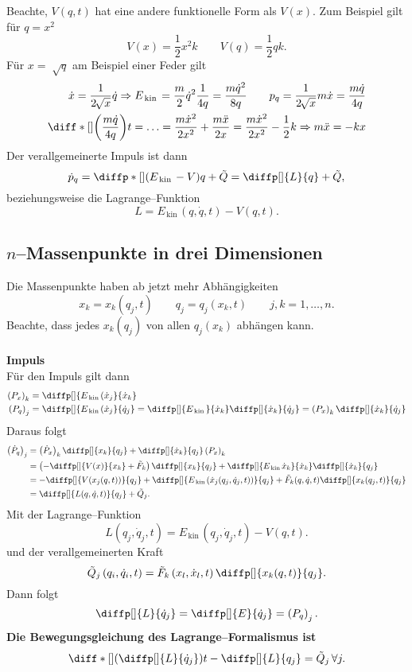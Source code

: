 \documentclass[a4paper,12pt]{article}
\numberwithin{equation}{section}
\begin{document}
Beachte, $V(q,t)$ hat eine andere funktionelle Form als $V(x)$. Zum Beispiel gilt für $q=x^2$
\[ 
        V(x)=\dfrac{1}{2}x^2k\qquad V(q)=\dfrac{1}{2}qk
.\] 
Für $x=\sqrt[]{q}$ am Beispiel einer Feder gilt
\begin{align*}
        \dot{x}=\dfrac{1}{2\,\sqrt[]{x}}\dot{q}\Rightarrow E_{\,\text{kin}\,}=\dfrac{m}{2}\dot{q}^2\dfrac{1}{4q}=\dfrac{m\dot{q}^2}{8q}\qquad p_q=\dfrac{1}{2\,\sqrt[]{x}}m\dot{x}=\dfrac{m\dot{q}}{4q}\\
        \diff*[]{\left(\dfrac{m\dot{q}}{4q}\right)}{t}=\hdots =\dfrac{m\dot{x}^2}{2x^2}+\dfrac{m\ddot{x}}{2x}=\dfrac{m\dot{x}^2}{2x^2}-\dfrac{1}{2}k\Rightarrow m\ddot{x}=-kx
\end{align*}
Der verallgemeinerte Impuls ist dann
\[ 
        \dot{p}_q=\diffp*[]{\left(E_{\,\text{kin}\,}-V\right)}{q}+\tilde Q=\diffp[]{L}{q}+\tilde Q
,\] 
beziehungsweise die Lagrange--Funktion
\[ 
        L=E_{\,\text{kin}\,}(q,\dot{q},t)-V(q,t)
.\] 

\subsection{$n$--Massenpunkte in drei Dimensionen}
Die Massenpunkte haben ab jetzt mehr Abhängigkeiten
\[ 
        x_k=x_k(q_j,t)\qquad q_j=q_j(x_k,t)\qquad j,k=1,\hdots ,n
.\] 
Beachte, dass jedes $x_k(q_j)$ von allen $q_j(x_k)$ abhängen kann.
\\\hfill\\\textbf{Impuls}\\ 
Für den Impuls gilt dann
\begin{align*}
        \left(P_x\right)_k&=\diffp[]{E_{\,\text{kin}\,}(\dot{x}_j}{\dot{x}_k}\\
        \left(P_q\right)_j&=\diffp[]{E_{\,\text{kin}\,}(\dot{x}_j}{\dot{q}_j}=\diffp[]{E_{\,\text{kin}\,}}{\dot{x}_k}\diffp[]{\dot{x}_k}{\dot{q}_j}=\left(P_x\right)_k\diffp[]{\dot{x}_k}{\dot{q}_j}
\end{align*}
Daraus folgt
\begin{align*}
        \left(\dot{P}_q\right)_j&=\left(\dot{P}_x\right)_k\diffp[]{x_k}{q_j}+\diffp[]{\dot{x}_k}{q_j}\left(P_x\right)_k\\
                                &=\left(-\diffp[]{V(x)}{x_k}+\tilde F_k\right)\diffp[]{x_k}{q_j}+\diffp[]{E_{\,\text{kin}\,}\dot{x}_k}{\dot{x}_k}\diffp[]{\dot{x}_k}{q_j}\\
                                &=-\diffp[]{V(x_j(q,t))}{q_j}+\diffp[]{E_{\,\text{kin}\,}(\dot{x}_j(q_j,\dot{q}_j,t))}{q_j}+\tilde F_k(q,\dot{q},t)\diffp[]{x_k(q_j,t)}{q_j}\\
                                &=\diffp[]{L(q,\dot{q},t)}{q_j}+\tilde Q_j
.\end{align*}
Mit der Lagrange--Funktion 
\[ 
L(q_j,\dot{q}_j,t)=E_{\,\text{kin}\,}\left(q_j,\dot{q}_j,t\right)-V(q,t)
.\]
und der verallgemeinerten Kraft 
\[
        \tilde Q_j\left(q_i,\dot{q}_i,t\right)=\tilde F_k\left(x_l,\dot{x}_l,t\right)\diffp[]{x_k(q,t)}{q_j}
.\]
Dann folgt
\[ 
        \diffp[]{L}{\dot{q}_j}=\diffp[]{E}{\dot{q}_j}=\left(P_q\right)_j
.\] 
\textbf{Die Bewegungsgleichung des Lagrange--Formalismus ist} 
\[ 
        \diff*[]{\left(\diffp[]{L}{\dot{q}_j}\right)}{t}-\diffp[]{L}{q_j}=\tilde Q_j\,\forall j
.\] 
\end{document}
